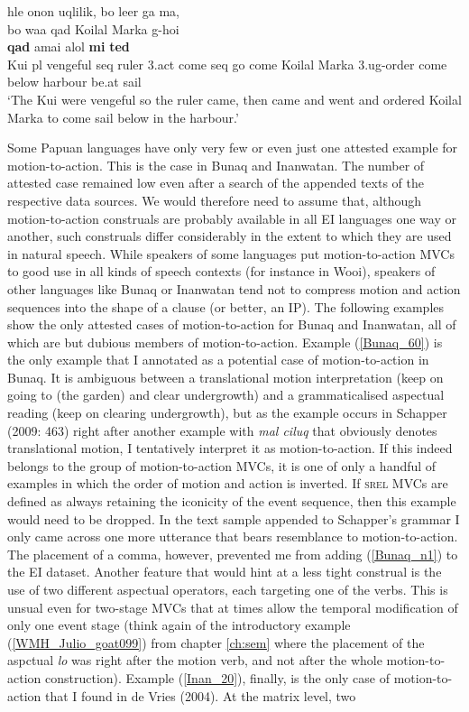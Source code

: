 \ea \label{KYO003}
\gll hle onon uqlilik, bo leer ga ma, \\ 
bo waa qad Koilal Marka g-hoi \\ 
\textbf{qad} amai alol \textbf{mi} \textbf{ted} \\
Kui \acs{pl} vengeful \acs{seq} ruler \acs{3}.\acs{act} come \acs{seq} go come Koilal Marka \acs{3}.\acs{ug}-order come below harbour be.at sail \\
\glft `The Kui were vengeful so the ruler came, then came and went and ordered Koilal Marka to come sail below in the harbour.' \\ 
\z
\xe

Some Papuan languages have only very few or even just one attested example for motion-to-action. This is the case in Bunaq and Inanwatan. The number of attested case remained low even after a search of the appended texts of the respective data sources. We would therefore need to assume that, although motion-to-action construals are probably available in all EI languages one way or another, such construals differ considerably in the extent to which they are used in natural speech. While speakers of some languages put motion-to-action MVCs to good use in all kinds of speech contexts (for instance in Wooi), speakers of other languages like Bunaq or Inanwatan tend not to compress motion and action sequences into the shape of a clause (or better, an IP). The following examples show the only attested cases of motion-to-action for Bunaq and Inanwatan, all of which are but dubious members of motion-to-action. Example (\ref{Bunaq_60}) is the only example that I annotated as a potential case of motion-to-action in Bunaq. It is ambiguous between a translational motion interpretation (keep on going to (the garden) and clear undergrowth) and a grammaticalised aspectual reading (keep on clearing undergrowth), but as the example occurs in Schapper (2009: 463) right after another example with \textit{mal ciluq} that obviously denotes translational motion, I tentatively interpret it as motion-to-action. If this indeed belongs to the group of motion-to-action MVCs, it is one of only a handful of examples in which the order of motion and action is inverted. If \textsc{srel} MVCs are defined as always retaining the iconicity of the event sequence, then this example would need to be dropped. In the text sample appended to Schapper's grammar I only came across one more utterance that bears resemblance to motion-to-action. The placement of a comma, however, prevented me from adding (\ref{Bunaq_n1}) to the EI dataset. Another feature that would hint at a less tight construal is the use of two different aspectual operators, each targeting one of the verbs. This is unsual even for two-stage MVCs that at times allow the temporal modification of only one event stage (think again of the introductory example (\ref{WMH_Julio_goat099}) from chapter \ref{ch:sem} where the placement of the aspctual \textit{lo} was right after the motion verb, and not after the whole motion-to-action construction). Example (\ref{Inan_20}), finally, is the only case of motion-to-action that I found in de Vries (2004). At the matrix level, two 
